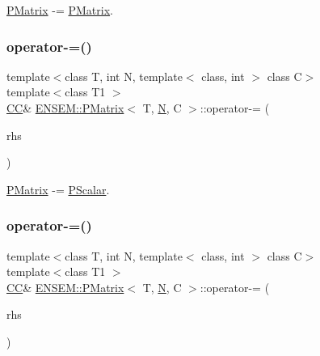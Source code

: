 \mbox{\hyperlink{classENSEM_1_1PMatrix}{P\+Matrix}} -\/= \mbox{\hyperlink{classENSEM_1_1PMatrix}{P\+Matrix}}. 

\mbox{\label{classENSEM_1_1PMatrix_ad33381d53cc105f6f64869316aa0e2c2}} 
\subsubsection{\texorpdfstring{operator-\/=()}{operator-=()}\hspace{0.1cm}{\footnotesize\ttfamily [3/4]}}
{\footnotesize\ttfamily template$<$class T, int N, template$<$ class, int $>$ class C$>$ \\
template$<$class T1 $>$ \\
\mbox{\hyperlink{classENSEM_1_1PMatrix_a744bac549029029effe32dc1705660ec}{CC}}\& \mbox{\hyperlink{classENSEM_1_1PMatrix}{E\+N\+S\+E\+M\+::\+P\+Matrix}}$<$ T, \mbox{\hyperlink{operator__name__util_8cc_a7722c8ecbb62d99aee7ce68b1752f337}{N}}, C $>$\+::operator-\/= (\begin{DoxyParamCaption}\item[{const \mbox{\hyperlink{classENSEM_1_1PScalar}{P\+Scalar}}$<$ T1 $>$ \&}]{rhs }\end{DoxyParamCaption})\hspace{0.3cm}{\ttfamily [inline]}}



\mbox{\hyperlink{classENSEM_1_1PMatrix}{P\+Matrix}} -\/= \mbox{\hyperlink{classENSEM_1_1PScalar}{P\+Scalar}}. 

\mbox{\label{classENSEM_1_1PMatrix_ad33381d53cc105f6f64869316aa0e2c2}} 
\subsubsection{\texorpdfstring{operator-\/=()}{operator-=()}\hspace{0.1cm}{\footnotesize\ttfamily [4/4]}}
{\footnotesize\ttfamily template$<$class T, int N, template$<$ class, int $>$ class C$>$ \\
template$<$class T1 $>$ \\
\mbox{\hyperlink{classENSEM_1_1PMatrix_a744bac549029029effe32dc1705660ec}{CC}}\& \mbox{\hyperlink{classENSEM_1_1PMatrix}{E\+N\+S\+E\+M\+::\+P\+Matrix}}$<$ T, \mbox{\hyperlink{operator__name__util_8cc_a7722c8ecbb62d99aee7ce68b1752f337}{N}}, C $>$\+::operator-\/= (\begin{DoxyParamCaption}\item[{const \mbox{\hyperlink{classENSEM_1_1PScalar}{P\+Scalar}}$<$ T1 $>$ \&}]{rhs }\end{DoxyParamCaption})\hspace{0.3cm}{\ttfamily [inline]}}



